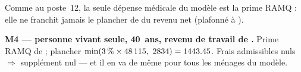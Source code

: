 \pexemples Comme au poste~12, la seule dépense médicale du modèle est la prime RAMQ :
elle ne franchit jamais le plancher de  du revenu net
(plafonné à ).

\medskip\noindent\textbf{M4 --- personne vivant seule, 40~ans, revenu de travail de .}
Prime RAMQ de  ; plancher
$\min(\num{3}\,\% \times \num{48115},\ \num{2834})
= \num{1443.45}$. Frais admissibles nuls $\Rightarrow$ supplément nul —
et il en va de même pour tous les ménages du modèle.
